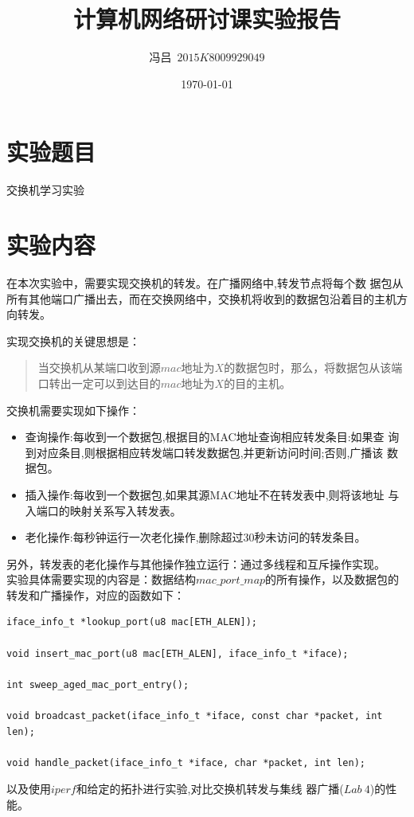 \documentclass[UTF8,noindent]{ctexart}
\title{\CJKfamily{zhkai}计算机网络研讨课实验报告}
\author{{\CJKfamily{zhkai}冯吕}\ $2015K8009929049$}
\date{\today}
\begin{document}
\maketitle
{}
\section*{{实验题目}}交换机学习实验 
\section*{{实验内容}}
在本次实验中，需要实现交换机的转发。在广播网络中,转发节点将每个数
据包从所有其他端口广播出去，而在交换网络中，交换机将收到的数据包沿着目的主机方向转发。

实现交换机的关键思想是：
\begin{quote}
  当交换机从某端口收到源$mac$地址为$X$的数据包时，那么，将数据包从该端口转出一定可以到达目的$mac$地址为$X$的目的主机。
\end{quote}

交换机需要实现如下操作：
\begin{itemize}
  \item 查询操作:每收到一个数据包,根据目的MAC地址查询相应转发条目:如果查
询到对应条目,则根据相应转发端口转发数据包,并更新访问时间;否则,广播该
数据包。
\item 插入操作:每收到一个数据包,如果其源MAC地址不在转发表中,则将该地址
与入端口的映射关系写入转发表。
\item 老化操作:每秒钟运行一次老化操作,删除超过30秒未访问的转发条目。
\end{itemize}

另外，转发表的老化操作与其他操作独立运行：通过多线程和互斥操作实现。\\

实验具体需要实现的内容是：数据结构$mac\_port\_map$的所有操作，以及数据包的转发和广播操作，对应的函数如下：
\begin{lstlisting}
iface_info_t *lookup_port(u8 mac[ETH_ALEN]);

void insert_mac_port(u8 mac[ETH_ALEN], iface_info_t *iface);

int sweep_aged_mac_port_entry();

void broadcast_packet(iface_info_t *iface, const char *packet, int len);

void handle_packet(iface_info_t *iface, char *packet, int len);
\end{lstlisting}
以及使用$iperf$和给定的拓扑进行实验,对比交换机转发与集线
器广播($Lab\ 4$)的性能。
\end{document}

